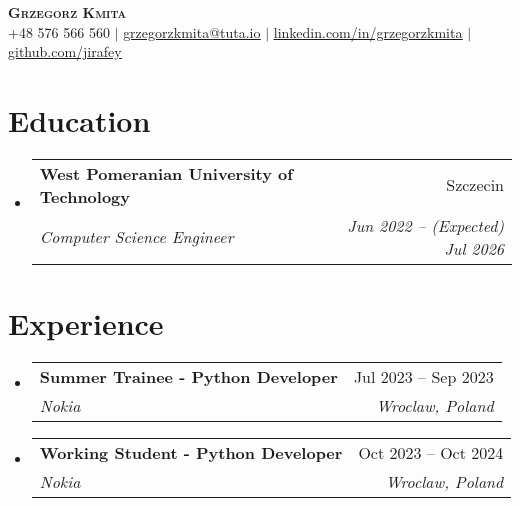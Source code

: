 \documentclass[letterpaper,10pt]{article}
\makeatletter
\newcommand{\resumeItem}[1]{
  \item\small{
    {#1 \vspace{-2pt}}
  }
}
\newcommand{\resumeSubheading}[4]{
  \vspace{-2pt}\item
    \begin{tabular*}{0.97\textwidth}[t]{l@{\extracolsep{\fill}}r}
      \textbf{#1} & #2 \\
      \textit{\small#3} & \textit{\small #4} \\
    \end{tabular*}\vspace{-7pt}
}
\newcommand{\resumeSubHeadingListStart}{\begin{itemize}[leftmargin=0.15in, label={}]}
\newcommand{\resumeSubHeadingListEnd}{\end{itemize}}
\newcommand{\resumeItemListStart}{\begin{itemize}}
\newcommand{\resumeItemListEnd}{\end{itemize}\vspace{-5pt}}
\makeatother
\begin{document}

\begin{center}
    \textbf{\Huge \scshape Grzegorz Kmita} \\ \vspace{1pt}
    \small +48 576 566 560 $|$ \href{mailto:grzegorzkmita@tuta.io}{\underline{grzegorzkmita@tuta.io}} $|$
    \href{https://linkedin.com/in/grzegorzkmita}{\underline{linkedin.com/in/grzegorzkmita}} $|$
    \href{https://github.com/jirafey}{\underline{github.com/jirafey}}
\end{center}

\section{Education}
  \resumeSubHeadingListStart
    \resumeSubheading
      {West Pomeranian University of Technology}{Szczecin} 
      {Computer Science Engineer}{Jun 2022 -- (Expected) Jul 2026}

  \resumeSubHeadingListEnd
\section{Experience}
  \resumeSubHeadingListStart

    \resumeSubheading
      {Summer Trainee - Python Developer}{Jul 2023 -- Sep 2023}
      {Nokia}{Wroclaw, Poland}


    \resumeSubheading
      {Working Student - Python Developer}{Oct 2023 -- Oct 2024}
      {Nokia}{Wroclaw, Poland}

  \resumeSubHeadingListEnd


\end{document}
